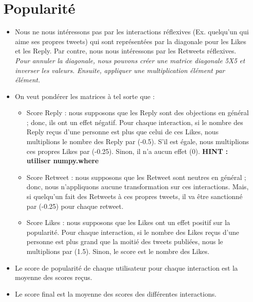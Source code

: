 \documentclass[11pt, a4paper]{article}
\begin{document}
\section*{Popularité}

\begin{itemize}
	\item Nous ne nous intéressons pas par les interactions réflexives (Ex. quelqu'un qui aime ses propres tweets) qui sont représentées par la diagonale pour les Likes et les Reply. 
	Par contre, nous nous intéressons par les Retweets réflexives.
	\textit{Pour annuler la diagonale, nous pouvons créer une matrice diagonale 5X5 et inverser les valeurs.
	Ensuite, appliquer une multiplication élément par élément.}
	\item On veut pondérer les matrices à tel sorte que :
	\begin{itemize}
		\item Score Reply : nous supposons que les Reply sont des objections en général ; donc, ils ont un effet négatif. 
		Pour chaque interaction, si le nombre des Reply reçus d'une personne est plus que celui de ces Likes, nous multiplions le nombre des Reply par (-0.5). S'il est égale, nous multiplions ces propres Likes par (-0.25). Sinon, il n'a aucun effet (0). \textbf{HINT : utiliser numpy.where}
		\item Score Retweet : nous supposons que les Retweet sont neutres en général ; donc, nous n'appliquons aucune transformation sur ces interactions.
		Mais, si quelqu'un fait des Retweets à ces propres tweets, il va être sanctionné par (-0.25) pour chaque retweet.
		\item Score Likes : nous supposons que les Likes ont un effet positif sur la popularité.
		Pour chaque interaction, si le nombre des Likes reçus d'une personne est plus grand que la moitié des tweets publiées, nous le multiplions par (1.5). Sinon, le score est le nombre des Likes.
	\end{itemize}
	\item Le score de popularité de chaque utilisateur pour chaque interaction est la moyenne des scores reçus.
	\item Le score final est la moyenne des scores des différentes interactions.

\end{itemize}
\end{document}
